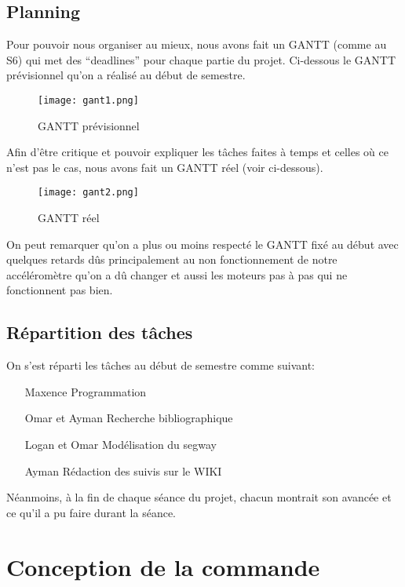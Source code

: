 \documentclass[oneside,a4paper,12pt]{article}
\begin{document}
	\subsection{Planning}
	
	Pour pouvoir nous organiser au mieux, nous avons fait un GANTT (comme au S6) qui met des “deadlines” pour chaque partie du projet. Ci-dessous le GANTT prévisionnel qu’on a réalisé au début de semestre.
	
	\begin{figure}[h]
		\centering
		\texttt{[image: gant1.png]}
		\caption{GANTT prévisionnel}
	\end{figure}

	Afin d’être critique et pouvoir expliquer les tâches faites à temps et celles où ce n'est pas le cas, nous avons fait un GANTT réel (voir ci-dessous).
	
	\begin{figure}[h]
		\centering
		\texttt{[image: gant2.png]}
		\caption{GANTT réel}
	\end{figure}

	On peut remarquer qu’on a plus ou moins respecté le GANTT fixé au début avec quelques retards dûs principalement au non fonctionnement de notre accéléromètre qu’on a dû changer et aussi les moteurs pas à pas qui ne fonctionnent pas bien.
	
	\newpage
	
	\subsection{Répartition des tâches}
	
	On s’est réparti les tâches au début de semestre comme suivant:
	
	\begin{itemize}
		\item[Maxence] Programmation
		\item[Omar et Ayman] Recherche bibliographique
		\item[Logan et Omar] Modélisation du segway
		\item[Ayman] Rédaction des suivis sur le WIKI
	\end{itemize}
	
	Néanmoins, à la fin de chaque séance du projet, chacun montrait son avancée et ce qu’il a pu faire durant la séance.
	
	\newpage

	\section{Conception de la commande}
	\label{Conception de la commande}
	
\end{document}
